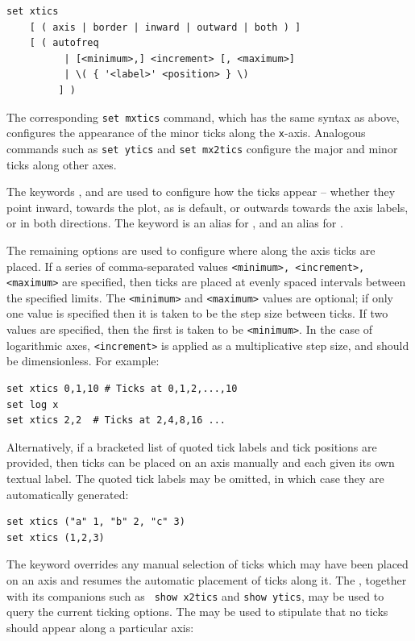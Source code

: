 \begin{verbatim}
set xtics
    [ ( axis | border | inward | outward | both ) ]
    [ ( autofreq
          | [<minimum>,] <increment> [, <maximum>]
          | \( { '<label>' <position> } \)
         ] )
\end{verbatim}

The corresponding {\tt set mxtics} command, which has the same syntax as above,
configures the appearance of the minor ticks along the {\tt x}-axis. Analogous
commands such as {\tt set ytics} and {\tt set mx2tics} configure the major and
minor ticks along other axes.

The keywords ,  and  are used to
configure how the ticks appear -- whether they point inward, towards the plot,
as is default, or outwards towards the axis labels, or in both directions.  The
keyword  is an alias for , and 
an alias for .

The remaining options are used to configure where along the axis ticks are
placed. If a series of comma-separated values {\tt <minimum>, <increment>,
<maximum>} are specified, then ticks are placed at evenly spaced intervals
between the specified limits. The {\tt <minimum>} and {\tt <maximum>} values
are optional; if only one value is specified then it is taken to be the step
size between ticks. If two values are specified, then the first is taken to be
{\tt <minimum>}. In the case of logarithmic axes, {\tt <increment>} is applied
as a multiplicative step size, and should be dimensionless. For example:
\begin{verbatim}
set xtics 0,1,10 # Ticks at 0,1,2,...,10
set log x
set xtics 2,2  # Ticks at 2,4,8,16 ...
\end{verbatim}

Alternatively, if a bracketed list of quoted tick labels and tick positions are
provided, then ticks can be placed on an axis manually and each given its own
textual label. The quoted tick labels may be omitted, in which case they are
automatically generated:
\begin{verbatim}
set xtics ("a" 1, "b" 2, "c" 3)
set xtics (1,2,3)
\end{verbatim}
The keyword  overrides any manual selection of ticks which
may have been placed on an axis and resumes the automatic placement of ticks
along it. The , together with its companions such as {\tt
show x2tics} and {\tt show ytics}, may be used to query the current ticking
options. The  may be used to stipulate that no ticks
should appear along a particular axis:

